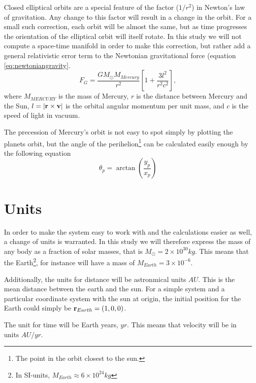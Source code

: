 \documentclass[10pt,a4paper]{amsart}
\begin{document}
Closed elliptical orbits are a special feature of the factor ($1/r^2$) in Newton's law of gravitation. Any change to this factor will result in a change in the orbit. For a small such correction, each orbit will be almost the same, but as time progresses the orientation of the elliptical orbit will itself rotate. In this study we will not compute a space-time manifold in order to make this correction, but rather add a general relativistic error term to the Newtonian gravitational force (equation \ref{eq:newtoniangravity}.
\begin{equation}
\label{eq:relativenewton}
F_G = \frac{GM_{\odot}M_{Mercury}}{r^2}\left[1+\frac{3l^2}{r^2c^2} \right],
\end{equation}
where $M_{MERCURY}$ is the mass of Mercury, $r$ is the distance between Mercury and the Sun, $l=\abs{\vb{r}\times\vb{v}}$ is the orbital angular momentum per unit mass, and $c$ is the speed of light in vacuum.

The precession of Mercury's orbit is not easy to spot simply by plotting the planets orbit, but the angle of the perihelion\footnote{The point in the orbit closest to the sun.} can be calculated easily enough by the following equation
\begin{equation}
\label{eq:perangle}
\theta_p = \arctan \left( \frac{y_p}{x_p}\right)
\end{equation}

\section{Units}
In order to make the system easy to work with and the calculations easier as well, a change of units is warranted. In this study we will therefore express the mass of any body as a fraction of solar masses, that is $M_{\odot} = 2\times10^{30}kg$. This means that the Earth\footnote{In SI-units, $M_{Earth}\approx6\times10^{24}kg$}, for instance will have a mass of $M_{Earth}= 3\times10^{-6}$.

Additionally, the units for distance will be astronmical units $AU$. This is the mean distance between the earth and the sun. For a simple system and a particular coordinate system with the sun at origin, the initial position for the Earth could simply be $\vb{r}_ {Earth}=(1,0,0)$.

The unit for time will be Earth years, $yr$. This means that velocity will be in units $AU/yr$.
\end{document}
